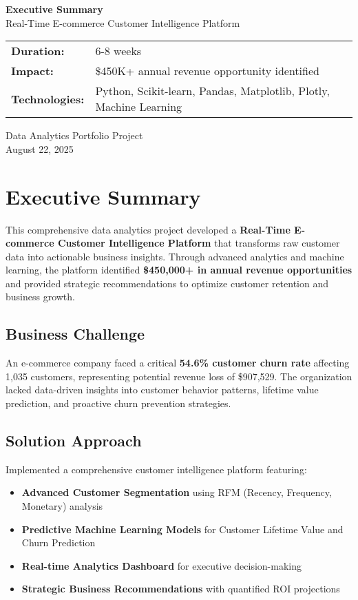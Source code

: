 \documentclass[11pt,letterpaper]{article}
\begin{document}
\begin{titlepage}
\centering
{\Huge\bfseries Executive Summary} \\[0.5cm]
{\Large Real-Time E-commerce Customer Intelligence Platform} \\[1cm]

\begin{tabular}{ll}
\textbf{Duration:} & 6-8 weeks \\
\textbf{Impact:} & \$450K+ annual revenue opportunity identified \\
\textbf{Technologies:} & Python, Scikit-learn, Pandas, Matplotlib, Plotly, Machine Learning \\
\end{tabular}

\vfill

{\large Data Analytics Portfolio Project} \\
{\large August 22, 2025}

\end{titlepage}

\section{Executive Summary}

This comprehensive data analytics project developed a \textbf{Real-Time E-commerce Customer Intelligence Platform} that transforms raw customer data into actionable business insights. Through advanced analytics and machine learning, the platform identified \textbf{\$450,000+ in annual revenue opportunities} and provided strategic recommendations to optimize customer retention and business growth.

\subsection{Business Challenge}
An e-commerce company faced a critical \textbf{54.6\% customer churn rate} affecting 1,035 customers, representing potential revenue loss of \$907,529. The organization lacked data-driven insights into customer behavior patterns, lifetime value prediction, and proactive churn prevention strategies.

\subsection{Solution Approach}
Implemented a comprehensive customer intelligence platform featuring:
\begin{itemize}[leftmargin=*]
\item \textbf{Advanced Customer Segmentation} using RFM (Recency, Frequency, Monetary) analysis
\item \textbf{Predictive Machine Learning Models} for Customer Lifetime Value and Churn Prediction
\item \textbf{Real-time Analytics Dashboard} for executive decision-making
\item \textbf{Strategic Business Recommendations} with quantified ROI projections
\end{itemize}
\end{document}

